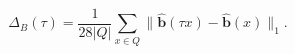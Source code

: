 \begin{equation}
\Delta_B(\tau)=\frac{1}{28|Q|}\sum_{x\in Q}\|\widehat{\mathbf b}(\tau x)-\widehat{\mathbf b}(x)\|_1 .
\label{eq:semantic_perturbation_change}
\tag{10}
\end{equation}
